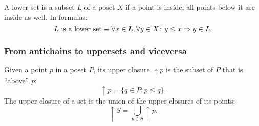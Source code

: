 \begin{definition}
\label{def:lowerset}
A lower set is a subset $L$ of a poset $X$ if a point is inside, all points below it are inside as well. In formulas:
\begin{equation}
\text{$L$ is a lower set} \equiv \forall x\in L, \forall y\in X\colon y\leq x \Rightarrow y\in L.
\end{equation}
\end{definition}


\subsubsection{From antichains to uppersets and viceversa}


\begin{definition}
\label{def:upperclosure}
Given a point $p$ in a poset $P$, its upper closure $\uparrow p$ is the subset of $P$ that is ``above'' $p$:
    \begin{equation}
        \uparrow p = \{ q\in P \colon p \leq q\}.
    \end{equation}
    The upper closure of a set is the union of the upper closures of its points:
    \begin{equation}
        \uparrow S = \bigcup_{p\in S}\uparrow p.
    \end{equation}
\end{definition}

